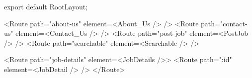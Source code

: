 export default RootLayout;






          <Route path="about-us" element={<About_Us />} />
          <Route path="contact-us" element={<Contact_Us />} />
          <Route path="post-job" element={<PostJob />} />
          <Route path="searchable" element={<Searchable />} />

          <Route path="job-details" element={<JobDetails />}>
            <Route path=":id" element={<JobDetail />} />
          </Route>